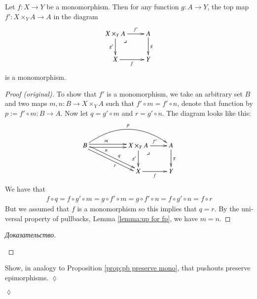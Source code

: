 \documentclass[a4paper]{book}
\makeatletter
\def\to{\rightarrow}
\def\taking{\colon}
\def\ullimit{\ar@{}[rd]|(.3)*+{\lrcorner}}
\theoremstyle{myth}
\newtheorem{propositionENG}[envENG]{\begin{english}Proposition\end{english}}
\newtheorem{excENG}[envENG]{\begin{english}Exercise\end{english}}
\newenvironment{proofENG}{\begin{proof}[Proof (original)]}{\end{proof}}
\newenvironment{exerciseENG}{\begin{excENG}}{\hspace*{\fill}$\lozenge$\end{excENG}}
\newtheorem{propositionRUS}[envRUS]{\begin{russian}Утверждение\end{russian}}
\newtheorem{excRUS}[envRUS]{\begin{russian}Упражнение\end{russian}}
\newenvironment{proofRUS}{\begin{proof}[Доказательство]}{\end{proof}}
\newenvironment{exerciseRUS}{\begin{excRUS}}{\hspace*{\fill}$\lozenge$\end{excRUS}}
\makeatother
\begin{document}
\begin{english}
\begin{propositionENG}\label{prop:pb preserve mono}
Let $f\taking X\to Y$ be a monomorphism. Then for any function $g\taking A\to Y$, the top map $f'\taking X\times_YA\to A$ in the diagram
$$
\xymatrix{X\times_YA\ar[r]^-{f'}\ar[d]_{g'}\ullimit&A\ar[d]^g\\X\ar[r]_f&Y}
$$
is a monomorphism.
\end{propositionENG}

\begin{propositionRUS}\label{prop:pb preserve mono}
\begin{russian} \end{russian}
\end{propositionRUS}

\begin{proofENG}
To show that $f'$ is a monomorphism, we take an arbitrary set $B$ and two maps $m,n\taking B\to X\times_YA$ such that $f'\circ m=f'\circ n$, denote that function by $p:=f'\circ m\taking B\to A$. Now let $q=g'\circ m$ and $r=g'\circ n$. The diagram looks like this:
$$
\xymatrix{B\ar@<.5ex>[rr]^(.4)m\ar@<-.5ex>[rr]_(.4)n\ar@/^2pc/[rrr]^p\ar@<.5ex>[drr]^(.6)q\ar@<-.5ex>[drr]_(.6)r&&X\times_YA\ar[r]^{f'}\ar[d]_{g'}\ullimit&A\ar[d]^g\\&&X\ar[r]_f&Y}
$$
We have that 
\begin{align*}f\circ q=f\circ g'\circ m=g\circ f'\circ m=g\circ f'\circ n=f\circ g'\circ n=f\circ r\end{align*} 
But we assumed that $f$ is a monomorphism so this implies that $q=r$. By the universal property of pullbacks, Lemma \ref{lemma:up for fp}, we have $m=n$.
\end{proofENG}

\begin{proofRUS}
\begin{russian} \end{russian}
\end{proofRUS}

\begin{exerciseENG}
Show, in analogy to Proposition \ref{prop:pb preserve mono}, that pushouts preserve epimorphisms.
\end{exerciseENG}

\begin{exerciseRUS}
\begin{russian} \end{russian}
\end{exerciseRUS}


\end{english}
\end{document}
